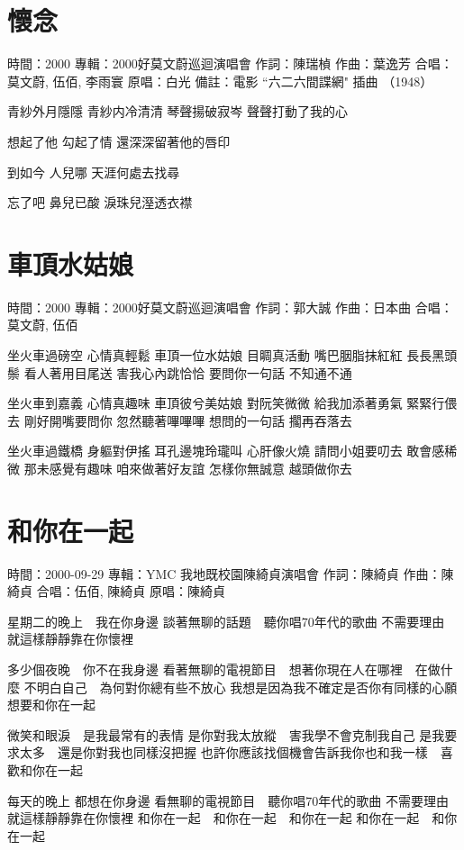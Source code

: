 \documentclass[UTF8,a4paper,oneside,twocolumn,12pt]{ctexbook}
\newcommand{\infopair}[2]{\textbullet #1：#2}
\newcommand{\zc}[1][伍佰]{\infopair{作詞}{#1}}
\newcommand{\zq}[1][伍佰]{\infopair{作曲}{#1}}
\newcommand{\zj}[1]{\infopair{專輯}{#1}}
\newcommand{\yc}[1]{\infopair{原唱}{#1}}
\newcommand{\sj}[1]{\infopair{時間}{#1}}
\newcommand{\bz}[1]{\infopair{備註}{#1}}
\newenvironment{info}{\begin{flushleft}\kaishu
	}
	{\end{flushleft}\normalsize\yahei\par}
\newenvironment{lyric}{
	}
{}
\begin{document}
\section{懷念}
\begin{info}
	\sj{2000}
	\zj{2000好莫文蔚巡迴演唱會}
	\zc[陳瑞楨]
	\zq[葉逸芳]
	\infopair{合唱}{莫文蔚, 伍佰, 李雨寰}
	\yc{白光}
	\bz{電影 ``六二六間諜網" 插曲 （1948）}
\end{info}
\begin{lyric}
	青紗外月隱隱 青紗内冷清清
	琴聲揚破寂岑 聲聲打動了我的心

	想起了他 勾起了情
	還深深留著他的唇印

	到如今 人兒哪
	天涯何處去找尋

	忘了吧 鼻兒已酸
	淚珠兒溼透衣襟
\end{lyric}

\section{車頂水姑娘}
\begin{info}
	\sj{2000}
	\zj{2000好莫文蔚巡迴演唱會}
	\zc[郭大誠]
	\zq[日本曲]
	\infopair{合唱}{莫文蔚, 伍佰}
\end{info}
\begin{lyric}
	坐火車過磅空 心情真輕鬆 車頂一位水姑娘 目睭真活動
	嘴巴胭脂抹紅紅 長長黑頭鬃 看人著用目尾送 害我心內跳恰恰
	要問你一句話 不知通不通

	坐火車到嘉義 心情真趣味 車頂彼兮美姑娘 對阮笑微微
	給我加添著勇氣 緊緊行偎去 剛好開嘴要問你 忽然聽著嗶嗶嗶
	想問的一句話 擱再吞落去

	坐火車過鐵橋 身軀對伊搖 耳孔邊塊玲瓏叫 心肝像火燒
	請問小姐要叨去 敢會感稀微 那未感覺有趣味 咱來做著好友誼
	怎樣你無誠意 越頭做你去
\end{lyric}

\section{和你在一起}
\begin{info}
	\sj{2000-09-29}
	\zj{YMC 我地既校園陳綺貞演唱會}
	\zc[陳綺貞]
	\zq[陳綺貞]
	\infopair{合唱}{伍佰, 陳綺貞}
	\yc{陳綺貞}
\end{info}
\begin{lyric}
	星期二的晚上　我在你身邊
	談著無聊的話題　聽你唱70年代的歌曲
	不需要理由　就這樣靜靜靠在你懷裡

	多少個夜晚　你不在我身邊
	看著無聊的電視節目　想著你現在人在哪裡　在做什麼
	不明白自己　為何對你總有些不放心
	我想是因為我不確定是否你有同樣的心願　想要和你在一起

	微笑和眼淚　是我最常有的表情
	是你對我太放縱　害我學不會克制我自己
	是我要求太多　還是你對我也同樣沒把握
	也許你應該找個機會告訴我你也和我一樣　喜歡和你在一起

	每天的晚上  都想在你身邊
	看無聊的電視節目　聽你唱70年代的歌曲
	不需要理由　就這樣靜靜靠在你懷裡
	和你在一起　和你在一起　和你在一起
	和你在一起　和你在一起
\end{lyric}
\end{document}
